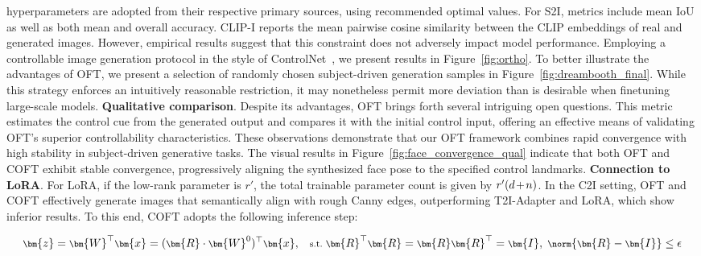 hyperparameters are adopted from their respective primary sources, using recommended optimal values. For S2I, metrics include mean IoU as well as both mean and overall accuracy. CLIP-I reports the mean pairwise cosine similarity between the CLIP embeddings of real and generated images. However, empirical results suggest that this constraint does not adversely impact model performance. Employing a controllable image generation protocol in the style of ControlNet~\cite{zhang2023adding}, we present results in Figure~\ref{fig:ortho}. To better illustrate the advantages of OFT, we present a selection of randomly chosen subject-driven generation samples in Figure~\ref{fig:dreambooth_final}. While this strategy enforces an intuitively reasonable restriction, it may nonetheless permit more deviation than is desirable when finetuning large-scale models. \textbf{Qualitative comparison}. Despite its advantages, OFT brings forth several intriguing open questions. This metric estimates the control cue from the generated output and compares it with the initial control input, offering an effective means of validating OFT’s superior controllability characteristics. These observations demonstrate that our OFT framework combines rapid convergence with high stability in subject-driven generative tasks. The visual results in Figure~\ref{fig:face_convergence_qual} indicate that both OFT and COFT exhibit stable convergence, progressively aligning the synthesized face pose to the specified control landmarks. \textbf{Connection to LoRA}. For LoRA, if the low-rank parameter is $r'$, the total trainable parameter count is given by $\thickmuskip=2mu \medmuskip=2mu r'(d+n)$. In the C2I setting, OFT and COFT effectively generate images that semantically align with rough Canny edges, outperforming T2I-Adapter and LoRA, which show inferior results. To this end, COFT adopts the following inference step:

\begin{equation}\label{eq:coft_general}
    \footnotesize
    \bm{z}=\bm{W}^\top\bm{x}=(\bm{R}\cdot\bm{W}^0)^\top\bm{x},~~~\text{s.t.}~\bm{R}^\top\bm{R}=\bm{R}\bm{R}^\top=\bm{I},~\norm{\bm{R}-\bm{I}}\leq \epsilon
\end{equation}

